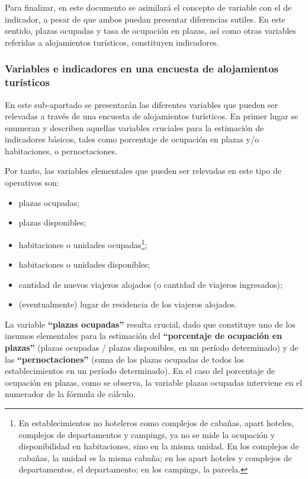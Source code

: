 \documentclass[
]{book}
\begin{document}
Para finalizar, en este documento se asimilará el concepto de variable con el de indicador, a pesar de que ambos puedan presentar diferencias sutiles. En este sentido, plazas ocupadas y tasa de ocupación en plazas, así como otras variables referidas a alojamientos turísticos, constituyen indicadores.

\hypertarget{variables-e-indicadores-en-una-encuesta-de-alojamientos-turuxedsticos}{%
\subsubsection{Variables e indicadores en una encuesta de alojamientos turísticos}\label{variables-e-indicadores-en-una-encuesta-de-alojamientos-turuxedsticos}}

En este sub-apartado se presentarán las diferentes variables que pueden ser relevadas a través de una encuesta de alojamientos turísticos. En primer lugar se enumeran y describen aquellas variables cruciales para la estimación de indicadores básicos, tales como porcentaje de ocupación en plazas y/o habitaciones, o pernoctaciones.

Por tanto, las variables elementales que pueden ser relevadas en este tipo de operativos son:

\begin{itemize}
\item
  plazas ocupadas;
\item
  plazas disponibles;
\item
  habitaciones o unidades ocupadas\footnote{En establecimientos no hoteleros como complejos de cabañas, apart hoteles, complejos de departamentos y campings, ya no se mide la ocupación y disponibilidad en habitaciones, sino en la misma unidad. En los complejos de cabañas, la unidad es la misma cabaña; en los apart hoteles y complejos de departamentos, el departamento; en los campings, la parcela.};
\item
  habitaciones o unidades disponibles;
\item
  cantidad de nuevos viajeros alojados (o cantidad de viajeros ingresados);
\item
  (eventualmente) lugar de residencia de los viajeros alojados.
\end{itemize}

La variable \textbf{``plazas ocupadas''} resulta crucial, dado que constituye uno de los insumos elementales para la estimación del \textbf{``porcentaje de ocupación en plazas''} (plazas ocupadas / plazas disponibles, en un período determinado) y de las \textbf{``pernoctaciones''} (suma de las plazas ocupadas de todos los establecimientos en un período determinado). En el caso del porcentaje de ocupación en plazas, como se observa, la variable plazas ocupadas interviene en el numerador de la fórmula de cálculo.
\end{document}
